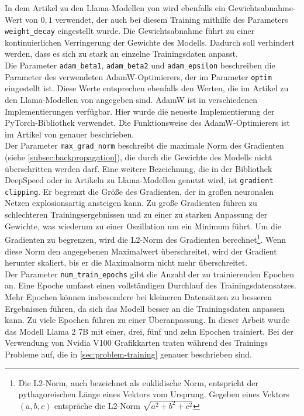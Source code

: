 In dem Artikel zu den Llama-Modellen von \citet{llama} wird ebenfalls ein Gewichtsabnahme-Wert von $0,1$ verwendet, der auch bei diesem Training mithilfe des Parameters \texttt{weight\_decay} eingestellt wurde.
Die Gewichtsabnahme führt zu einer kontinuierlichen Verringerung der Gewichte des Modells. Dadurch soll verhindert werden, dass es sich zu stark an einzelne Trainingsdaten anpasst.\\

Die Parameter \texttt{adam\_beta1}, \texttt{adam\_beta2} und \texttt{adam\_epsilon} beschreiben die Parameter des verwendeten AdamW-Optimierers, der im Parameter \texttt{optim} eingestellt ist.
Diese Werte entsprechen ebenfalls den Werten, die im Artikel zu den Llama-Modellen von \citet{llama} angegeben sind.
AdamW ist in verschiedenen Implementierungen verfügbar. Hier wurde die neueste Implementierung der PyTorch-Bibliothek verwendet.
Die Funktionsweise des AdamW-Optimierers ist im Artikel von \citet{adamw} genauer beschrieben.\\

Der Parameter \texttt{max\_grad\_norm} beschreibt die maximale Norm des Gradienten (siehe \cref{subsec:backpropagation}), die durch die Gewichte des Modells nicht überschritten werden darf.
Eine weitere Bezeichnung, die in der Bibliothek DeepSpeed oder in Artikeln zu Llama-Modellen genutzt wird, ist \texttt{gradient clipping}.
Er begrenzt die Größe des Gradienten, der in großen neuronalen Netzen explosionsartig ansteigen kann.
Zu große Gradienten führen zu schlechteren Trainingsergebnissen und zu einer zu starken Anpassung der Gewichte, was wiederum zu einer Oszillation um ein Minimum führt.
Um die Gradienten zu begrenzen, wird die L2-Norm des Gradienten berechnet\footnote{Die L2-Norm, auch bezeichnet als euklidische Norm, entspricht der pythagoreischen Länge eines Vektors vom Ursprung. Gegeben eines Vektors $(a,b,c)$ entspräche die L2-Norm $\sqrt{a^2+b^2+c^2}$}.
Wenn diese Norm den angegebenen Maximalwert überschreitet, wird der Gradient herunter skaliert, bis er die Maximalnorm nicht mehr überschreitet.\\

Der Parameter \texttt{num\_train\_epochs} gibt die Anzahl der zu trainierenden Epochen an.
Eine Epoche umfasst einen vollständigen Durchlauf des Trainingsdatensatzes.
Mehr Epochen können insbesondere bei kleineren Datensätzen zu besseren Ergebnissen führen, da sich das Modell besser an die Trainingsdaten anpassen kann.
Zu viele Epochen führen zu einer Überanpassung.
In dieser Arbeit wurde das Modell Llama 2 7B mit einer, drei, fünf und zehn Epochen trainiert.
Bei der Verwendung von Nvidia V100 Grafikkarten traten während des Trainings Probleme auf, die in \cref{sec:problem-training} genauer beschrieben sind.\\

